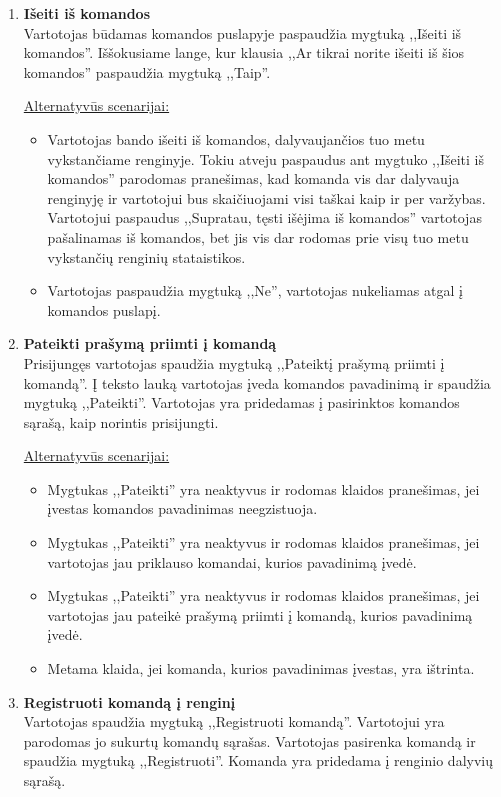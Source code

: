 \documentclass{VUMIFPSkursinis}
\begin{document}
\begin{enumerate} [label = \textbf{U\arabic*.}]
			\item \textbf{Išeiti iš komandos} \\
				Vartotojas būdamas komandos puslapyje paspaudžia mygtuką ,,Išeiti iš komandos''. Iššokusiame lange, kur klausia ,,Ar tikrai norite išeiti iš šios komandos'' paspaudžia mygtuką ,,Taip''.
				
				\underline{Alternatyvūs scenarijai:}
				\begin{itemize}
					\item Vartotojas bando išeiti iš komandos, dalyvaujančios tuo metu vykstančiame renginyje. Tokiu atveju paspaudus ant mygtuko  ,,Išeiti iš komandos'' parodomas pranešimas, kad komanda vis dar dalyvauja renginyję ir vartotojui bus skaičiuojami visi taškai kaip ir per varžybas. Vartotojui paspaudus ,,Supratau, tęsti išėjima iš komandos'' vartotojas pašalinamas iš komandos, bet jis vis dar rodomas prie visų tuo metu vykstančių renginių stataistikos.
					\item Vartotojas paspaudžia mygtuką ,,Ne'', vartotojas nukeliamas atgal į komandos puslapį.
					\end{itemize}

			\item \textbf{Pateikti prašymą priimti į komandą} \\
				Prisijungęs vartotojas spaudžia mygtuką ,,Pateiktį prašymą priimti į komandą''. Į teksto lauką vartotojas įveda komandos pavadinimą ir spaudžia mygtuką ,,Pateikti''. Vartotojas yra pridedamas į pasirinktos komandos sąrašą, kaip norintis prisijungti.
				
				\underline{Alternatyvūs scenarijai:}
				\begin{itemize}
					\item Mygtukas ,,Pateikti'' yra neaktyvus ir rodomas klaidos pranešimas, jei įvestas komandos pavadinimas neegzistuoja.
					\item Mygtukas ,,Pateikti'' yra neaktyvus ir rodomas klaidos pranešimas, jei vartotojas jau priklauso komandai, kurios pavadinimą įvedė.
					\item Mygtukas ,,Pateikti'' yra neaktyvus ir rodomas klaidos pranešimas, jei vartotojas jau pateikė prašymą priimti į komandą, kurios pavadinimą įvedė.
					\item Metama klaida, jei komanda, kurios pavadinimas įvestas, yra ištrinta.
				\end{itemize}
				
			\item \textbf{Registruoti komandą į renginį} \\
				Vartotojas spaudžia mygtuką ,,Registruoti komandą''. Vartotojui yra parodomas jo sukurtų komandų sąrašas. Vartotojas pasirenka komandą ir spaudžia mygtuką ,,Registruoti''. Komanda yra pridedama į renginio dalyvių sąrašą.
				

\end{enumerate}
\end{document}
